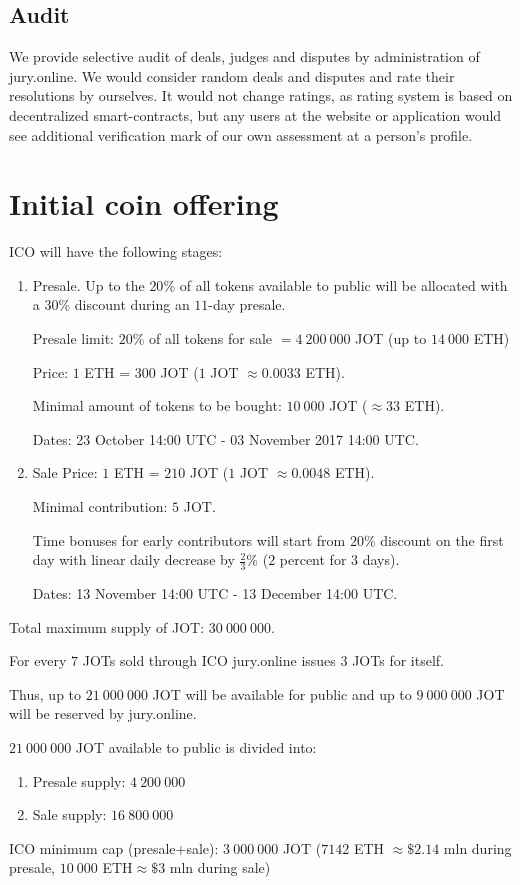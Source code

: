 \documentclass[12pt]{article}
\begin{document}
\subsection{Audit}
We provide selective audit of deals, judges and disputes by administration of jury.online. We would consider random deals and disputes and
rate their resolutions by ourselves. It would not change ratings, as rating system is based on decentralized smart-contracts, but any users
at the website or application would see additional verification mark of our own assessment at a person’s profile. 

\section{Initial coin offering}
ICO will have the following stages:

\begin{enumerate}
		\item Presale. 
				Up to the $20\%$ of all tokens available to public will be allocated with a $30\%$ discount during an $11$-day presale.

				Presale limit: $20\%$ of all tokens for sale $=4\ 200\ 000$ JOT (up to $14\ 000$ ETH)

				Price: $1$ ETH = $300$ JOT ($1$ JOT $\approx 0.0033$ ETH).

				Minimal amount of tokens to be bought: $10\ 000$ JOT ($\approx 33$ ETH).

				Dates: 23 October 14:00 UTC -  03 November 2017 14:00 UTC.

		\item Sale
				Price: $1$ ETH = $210$ JOT ($1$ JOT $\approx 0.0048$ ETH).

				Minimal contribution: $5$ JOT. 

				Time bonuses for early contributors will start from $20\%$ discount on the first day with linear daily decrease by $\frac{2}{3}$\% ($2$ percent for $3$ days).

				Dates: 13 November 14:00 UTC - 13 December 14:00 UTC.
\end{enumerate}

Total maximum supply of JOT: $30\ 000\ 000$.

For every $7$ JOTs sold through ICO jury.online issues $3$ JOTs for itself. 

Thus, up to $21\ 000\ 000$ JOT will be available for public and up to $9\ 000\ 000$ JOT will be reserved by jury.online.

$21\ 000\ 000$ JOT available to public is divided into:
\begin{enumerate}
		\item Presale supply: $4\ 200\ 000$
		\item Sale supply: $16\ 800\ 000$
\end{enumerate}
ICO minimum cap (presale+sale): $3\ 000\ 000$ JOT ($7142$ ETH $\approx \$2.14$ mln during presale, $10\ 000$ ETH$\approx \$3$ mln during sale)
\end{document}
